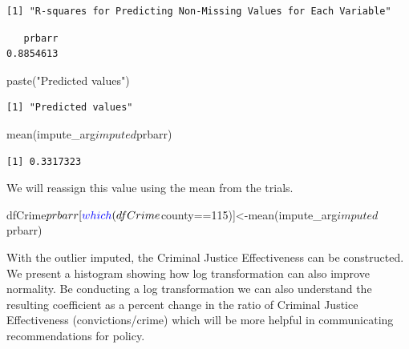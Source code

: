 \documentclass[]{article}
\newenvironment{Shaded}{}{}
\newcommand{\DecValTok}[1]{#1}
\newcommand{\KeywordTok}[1]{\textcolor[rgb]{0.00,0.00,1.00}{#1}}
\newcommand{\NormalTok}[1]{#1}
\newcommand{\OperatorTok}[1]{#1}
\newcommand{\StringTok}[1]{\textcolor[rgb]{0.00,0.50,0.50}{#1}}
\begin{document}
\begin{verbatim}
[1] "R-squares for Predicting Non-Missing Values for Each Variable"
\end{verbatim}

\begin{Shaded}
\end{Shaded}

\begin{verbatim}
   prbarr 
0.8854613 
\end{verbatim}

\begin{Shaded}
\begin{Highlighting}[]
\KeywordTok{paste}\NormalTok{(}\StringTok{"Predicted values"}\NormalTok{)}
\end{Highlighting}
\end{Shaded}

\begin{verbatim}
[1] "Predicted values"
\end{verbatim}

\begin{Shaded}
\begin{Highlighting}[]
\KeywordTok{mean}\NormalTok{(impute_arg}\OperatorTok{$}\NormalTok{imputed}\OperatorTok{$}\NormalTok{prbarr)}
\end{Highlighting}
\end{Shaded}

\begin{verbatim}
[1] 0.3317323
\end{verbatim}

We will reassign this value using the mean from the trials.

\begin{Shaded}
\begin{Highlighting}[]
\NormalTok{dfCrime}\OperatorTok{$}\NormalTok{prbarr[}\KeywordTok{which}\NormalTok{(dfCrime}\OperatorTok{$}\NormalTok{county}\OperatorTok{==}\DecValTok{115}\NormalTok{)]<-}\KeywordTok{mean}\NormalTok{(impute_arg}\OperatorTok{$}\NormalTok{imputed}\OperatorTok{$}\NormalTok{prbarr)}
\end{Highlighting}
\end{Shaded}

With the outlier imputed, the Criminal Justice Effectiveness can be
constructed. We present a histogram showing how log transformation can
also improve normality. Be conducting a log transformation we can also
understand the resulting coefficient as a percent change in the ratio of
Criminal Justice Effectiveness (convictions/crime) which will be more
helpful in communicating recommendations for policy.
\end{document}
